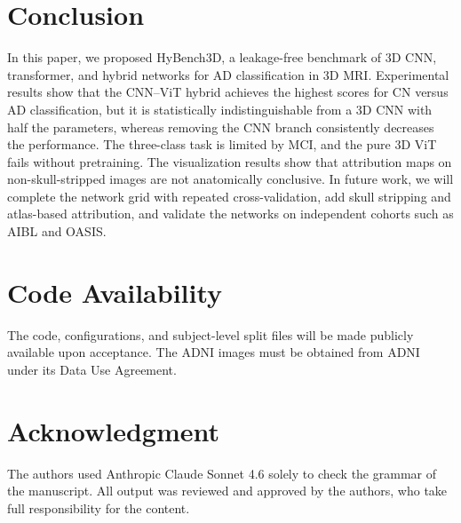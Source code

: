 \documentclass[conference,a4paper]{IEEEtran}
\begin{document}
\section{Conclusion}
In this paper, we proposed HyBench3D, a leakage-free benchmark of 3D CNN, transformer, and hybrid networks for AD classification in 3D MRI. Experimental results show that the CNN--ViT hybrid achieves the highest scores for CN versus AD classification, but it is statistically indistinguishable from a 3D CNN with half the parameters, whereas removing the CNN branch consistently decreases the performance. The three-class task is limited by MCI, and the pure 3D ViT fails without pretraining. The visualization results show that attribution maps on non-skull-stripped images are not anatomically conclusive. In future work, we will complete the network grid with repeated cross-validation, add skull stripping and atlas-based attribution, and validate the networks on independent cohorts such as AIBL and OASIS.

\section*{Code Availability}
The code, configurations, and subject-level split files will be made publicly available upon acceptance. The ADNI images must be obtained from ADNI under its Data Use Agreement.

\section*{Acknowledgment}
{\footnotesize The authors used Anthropic Claude Sonnet 4.6 solely to check the grammar of the manuscript. All output was reviewed and approved by the authors, who take full responsibility for the content.}
\end{document}
